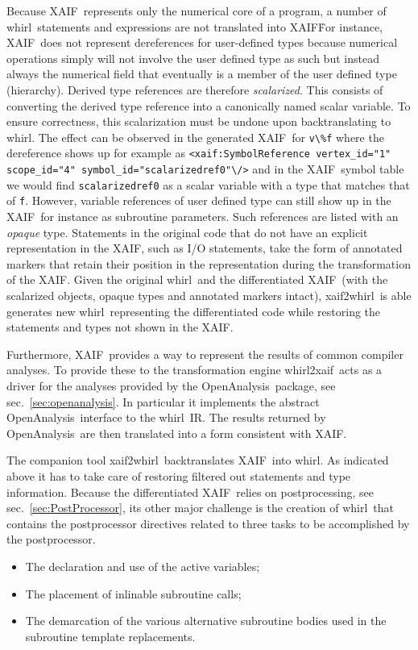 \documentclass{book}
\newcommand{\OpenAnalysis}{OpenAnalysis}
\newcommand{\xaif}{XAIF}
\newcommand{\whirl}{whirl}
\newcommand{\whirlToxaif}{whirl2xaif}
\newcommand{\xaifTowhirl}{xaif2whirl}
\newcommand{\refsec}[1]{{sec.~\ref{#1}}}
\begin{document}
Because \xaif\
represents only the numerical core of a program, a number of \whirl\
statements and expressions are not translated into \xaif\.  For
instance, \xaif\ does not represent dereferences for user-defined types 
because numerical operations simply will not involve the user defined 
type as such but instead always the numerical field that eventually is a member 
of the user defined type (hierarchy). 
Derived type references are therefore {\em scalarized}. This consists of converting
the derived type reference into a canonically named scalar variable.
To ensure correctness, this scalarization must be undone upon backtranslating 
to \whirl. The effect can be observed in the generated \xaif\ for \lstinline{v\%f} where 
the dereference 
shows up for example 
as \lstinline{<xaif:SymbolReference vertex_id="1" scope_id="4" symbol_id="scalarizedref0"\/>}
and in the \xaif\ symbol table we would find \lstinline{scalarizedref0} as a scalar variable with 
a type that matches that of \lstinline{f}. 
However, variable references of user defined type can still show up in the \xaif\ for 
instance as subroutine parameters. Such references are listed with an 
{\em opaque} type. Statements in the original code that do not have an 
explicit representation in the  \xaif, 
such as I/O statements, take the form of annotated markers that retain 
their position in the representation during the transformation of the \xaif.  
Given the original
\whirl\ and the differentiated \xaif\ (with the scalarized objects, opaque types
and annotated markers intact), \xaifTowhirl\ is able generates new \whirl\ representing the
differentiated code while restoring the statements and types not shown in the \xaif.   

Furthermore, \xaif\ provides a way to represent the results of  common
compiler analyses.  To provide these to the transformation engine 
\whirlToxaif\ acts as a driver for the analyses provided by the 
\OpenAnalysis\ package, see \refsec{sec:openanalysis}.
In particular it implements the abstract \OpenAnalysis\ interface
to the \whirl\ IR. The results returned by \OpenAnalysis\ are then 
translated into a form consistent with \xaif.

The companion tool \xaifTowhirl\ backtranslates \xaif\ into \whirl. 
As indicated above it has to take care of restoring filtered out 
statements and type information. Because the differentiated \xaif\ 
relies on postprocessing, see \refsec{sec:PostProcessor}, 
its other major challenge is the 
creation of \whirl\ that contains the postprocessor directives related to
three tasks to be accomplished by the postprocessor. 
\begin{itemize} 
\item The declaration and use of the active variables;
\item The placement of inlinable subroutine calls;
\item The demarcation of the various alternative subroutine bodies used in the subroutine template replacements.
\end{itemize}  
\end{document}
